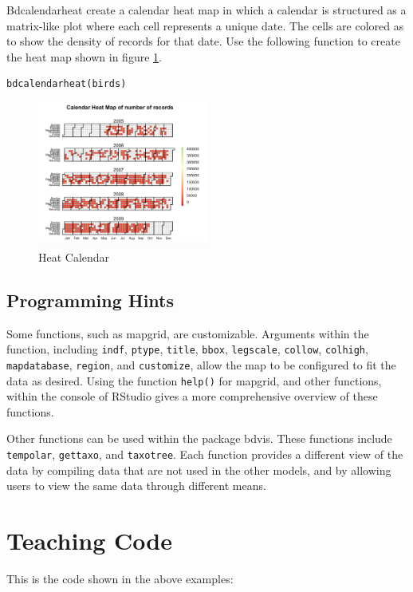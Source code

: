 Bdcalendarheat create a calendar heat map in which a calendar is structured as a matrix-like plot where each cell represents a unique date.
The cells are colored as to show the density of records for that date.
Use the following function to create the heat map shown in figure \ref{fig:heatcal}.

\begin{lstlisting}
bdcalendarheat(birds)
\end{lstlisting}

\begin{figure}[htbp!] 
   \centering
   \includegraphics[width=0.5\textwidth]{pictures/biodiversity/heatmap.jpg} 
      \caption{Heat Calendar}
   \label{fig:heatcal}
\end{figure} 

 \subsection{Programming Hints}
 
 Some functions, such as mapgrid, are customizable.
 Arguments within the function, including \texttt{indf}, \texttt{ptype}, \texttt{title}, \texttt{bbox}, \texttt{legscale}, \texttt{collow}, \texttt{colhigh}, \texttt{mapdatabase}, \texttt{region}, and \texttt{customize}, allow the map to be configured to fit the data as desired.
 Using the function \texttt{help()} for mapgrid, and other functions, within the console of RStudio gives a more comprehensive overview of these functions. 
 
 Other functions can be used within the package bdvis.
 These functions include \texttt{tempolar}, \texttt{gettaxo}, and \texttt{taxotree}.
 Each function provides a different view of the data by compiling data that are not used in the other models, and by allowing users to view the same data through different means.
 

\section{Teaching Code}
This is the code shown in the above examples:

